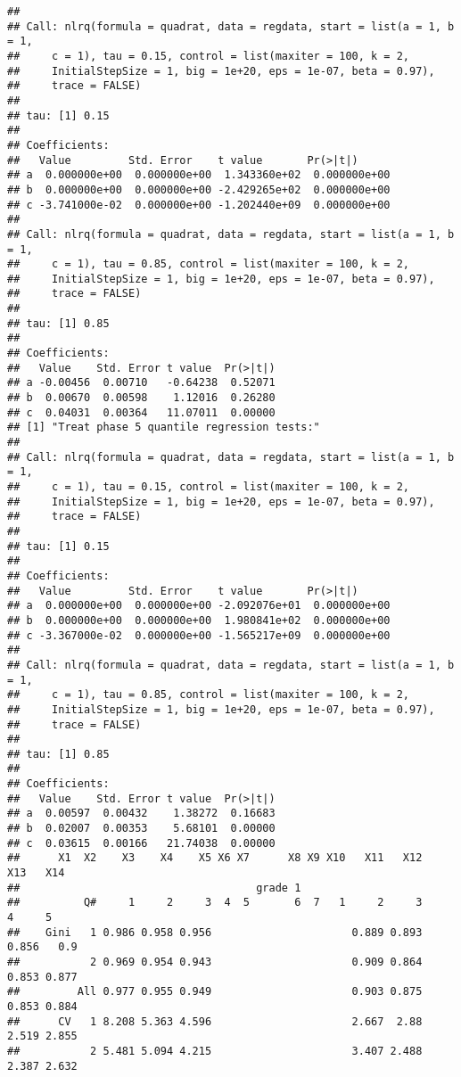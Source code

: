 \documentclass[
]{article}
\begin{document}
\begin{verbatim}
## 
## Call: nlrq(formula = quadrat, data = regdata, start = list(a = 1, b = 1, 
##     c = 1), tau = 0.15, control = list(maxiter = 100, k = 2, 
##     InitialStepSize = 1, big = 1e+20, eps = 1e-07, beta = 0.97), 
##     trace = FALSE)
## 
## tau: [1] 0.15
## 
## Coefficients:
##   Value         Std. Error    t value       Pr(>|t|)     
## a  0.000000e+00  0.000000e+00  1.343360e+02  0.000000e+00
## b  0.000000e+00  0.000000e+00 -2.429265e+02  0.000000e+00
## c -3.741000e-02  0.000000e+00 -1.202440e+09  0.000000e+00
## 
## Call: nlrq(formula = quadrat, data = regdata, start = list(a = 1, b = 1, 
##     c = 1), tau = 0.85, control = list(maxiter = 100, k = 2, 
##     InitialStepSize = 1, big = 1e+20, eps = 1e-07, beta = 0.97), 
##     trace = FALSE)
## 
## tau: [1] 0.85
## 
## Coefficients:
##   Value    Std. Error t value  Pr(>|t|)
## a -0.00456  0.00710   -0.64238  0.52071
## b  0.00670  0.00598    1.12016  0.26280
## c  0.04031  0.00364   11.07011  0.00000
## [1] "Treat phase 5 quantile regression tests:"
## 
## Call: nlrq(formula = quadrat, data = regdata, start = list(a = 1, b = 1, 
##     c = 1), tau = 0.15, control = list(maxiter = 100, k = 2, 
##     InitialStepSize = 1, big = 1e+20, eps = 1e-07, beta = 0.97), 
##     trace = FALSE)
## 
## tau: [1] 0.15
## 
## Coefficients:
##   Value         Std. Error    t value       Pr(>|t|)     
## a  0.000000e+00  0.000000e+00 -2.092076e+01  0.000000e+00
## b  0.000000e+00  0.000000e+00  1.980841e+02  0.000000e+00
## c -3.367000e-02  0.000000e+00 -1.565217e+09  0.000000e+00
## 
## Call: nlrq(formula = quadrat, data = regdata, start = list(a = 1, b = 1, 
##     c = 1), tau = 0.85, control = list(maxiter = 100, k = 2, 
##     InitialStepSize = 1, big = 1e+20, eps = 1e-07, beta = 0.97), 
##     trace = FALSE)
## 
## tau: [1] 0.85
## 
## Coefficients:
##   Value    Std. Error t value  Pr(>|t|)
## a  0.00597  0.00432    1.38272  0.16683
## b  0.02007  0.00353    5.68101  0.00000
## c  0.03615  0.00166   21.74038  0.00000
##      X1  X2    X3    X4    X5 X6 X7      X8 X9 X10   X11   X12   X13   X14
##                                     grade 1                               
##          Q#     1     2     3  4  5       6  7   1     2     3     4     5
##    Gini   1 0.986 0.958 0.956                      0.889 0.893 0.856   0.9
##           2 0.969 0.954 0.943                      0.909 0.864 0.853 0.877
##         All 0.977 0.955 0.949                      0.903 0.875 0.853 0.884
##      CV   1 8.208 5.363 4.596                      2.667  2.88 2.519 2.855
##           2 5.481 5.094 4.215                      3.407 2.488 2.387 2.632

\end{verbatim}
\end{document}
